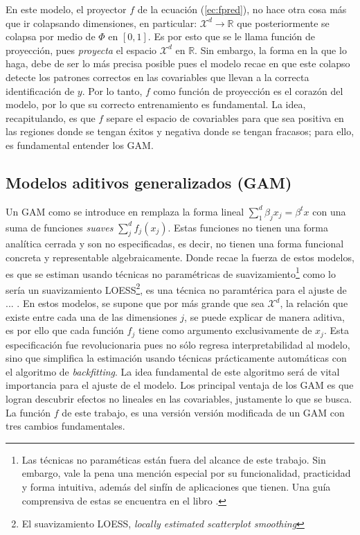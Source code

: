 \documentclass[../Main/Main.tex]{subfiles}
\begin{document}
En este modelo, el proyector $f$ de la ecuación (\ref{ec:fpred}), no hace otra cosa más que ir colapsando dimensiones, en particular: $\mathcal{X}^d \rightarrow \mathbb{R}$ que posteriormente se colapsa por medio de $\Phi$ en $[0,1]$. Es por esto que se le llama función de proyección, pues \textit{proyecta} el espacio $\mathcal{X}^d$ en $\mathbb{R}$. Sin embargo, la forma en la que lo haga, debe de ser lo más precisa posible pues el modelo recae en que este colapso detecte los patrones correctos en las covariables que llevan a la correcta identificación de $y$. Por lo tanto, $f$ como función de proyección es el corazón del modelo, por lo que su correcto entrenamiento es fundamental. La idea, recapitulando, es que $f$ separe el espacio de covariables para que sea positiva en las regiones donde se tengan éxitos y negativa donde se tengan fracasos; para ello, es fundamental entender los GAM.

\subsection{Modelos aditivos generalizados (GAM)} \label{sec:GAM}
Un GAM como se introduce en \citet{hastie1986generalized} remplaza la forma lineal $\sum_{1}^d\beta_jx_j = \beta^tx$ con una suma de funciones \textit{suaves} $\sum_j^d f_j(x_j)$. Estas funciones no tienen una forma analítica cerrada y son no especificadas, es decir, no tienen una forma funcional concreta y representable algebraicamente. Donde recae la fuerza de estos modelos, es que se estiman usando técnicas no paramétricas de suavizamiento\footnote{Las técnicas no paraméticas están fuera del alcance de este trabajo. Sin embargo, vale la pena una mención especial por su funcionalidad, practicidad y forma intuitiva, además del sinfín de aplicaciones que tienen. Una guía comprensiva de estas se encuentra en el libro \citet{wasserman2007all}.} como lo sería un suavizamiento LOESS\footnote{El suavizamiento LOESS, \textit{locally estimated scatterplot smoothing}}, es una técnica no paramtérica para el ajuste de ... \autocite{cleveland1988locally}. En estos modelos, se supone que por más grande que sea $\mathcal{X}^d$, la relación que existe entre cada una de las dimensiones $j$, se puede explicar de manera aditiva, es por ello que cada función $f_j$ tiene como argumento exclusivamente de $x_j$. Esta especificación fue revolucionaria pues no sólo regresa interpretabilidad al modelo, sino que simplifica la estimación usando técnicas prácticamente automáticas con el algoritmo de \textit{backfitting}. La idea fundamental de este algoritmo será de vital importancia para el ajuste de el modelo. Los principal ventaja de los GAM es que logran descubrir efectos no lineales en las covariables, justamente lo que se busca. La función $f$ de este trabajo, es una versión versión modificada de un GAM con tres cambios fundamentales. 
\end{document}
